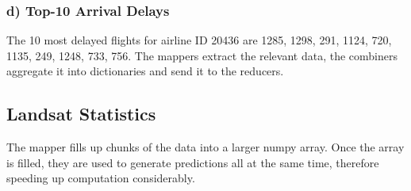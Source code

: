 \subsubsection*{d) Top-10 Arrival Delays}
The 10 most delayed flights for airline ID 20436 are 1285, 1298, 291, 1124, 720, 1135, 249, 1248, 733, 756.
The mappers extract the relevant data, the combiners aggregate it into dictionaries and send it to the reducers.




\subsection{Landsat Statistics}
The mapper fills up chunks of the data into a larger numpy array. Once the array is filled, they are used to generate predictions all at the same time, therefore speeding up computation considerably.




